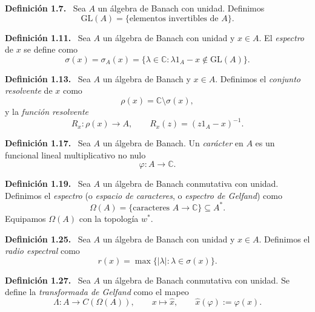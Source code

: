 \documentclass[11pt]{article}
\newcommand{\GL}{\mathrm{GL}}
\newenvironment{definicion}[1]
  {\par\medskip\noindent\textbf{Definición #1.}\ }
  {\par\medskip}
\begin{document}
\begin{definicion}{1.7}
Sea $A$ un álgebra de Banach con unidad. Definimos
\[
  \GL(A)=\{\text{elementos invertibles de }A\}.
\]
\end{definicion}

\begin{definicion}{1.11}
Sea $A$ un álgebra de Banach con unidad y $x\in A$. El \emph{espectro} de $x$ se define como
\[
  \sigma(x)=\sigma_A(x)
  =\{\lambda\in\mathbb{C}:\lambda 1_A-x\notin\GL(A)\}.
\]
\end{definicion}

\begin{definicion}{1.13}
Sea $A$ un álgebra de Banach y $x\in A$. Definimos el \emph{conjunto resolvente} de $x$ como
\[
  \rho(x)=\mathbb{C}\setminus\sigma(x),
\]
y la \emph{función resolvente}
\[
  R_x:\rho(x)\longrightarrow A,
  \qquad
  R_x(z)=(z1_A-x)^{-1}.
\]
\end{definicion}

\begin{definicion}{1.17}
Sea $A$ un álgebra de Banach. Un \emph{carácter} en $A$ es un funcional lineal multiplicativo no nulo
\[
  \varphi:A\longrightarrow\mathbb{C}.
\]
\end{definicion}

\begin{definicion}{1.19}
Sea $A$ un álgebra de Banach conmutativa con unidad. Definimos el \emph{espectro} (o \emph{espacio de caracteres}, o \emph{espectro de Gelfand}) como
\[
  \Omega(A)=\{\text{caracteres }A\to\mathbb{C}\}\subseteq A^*.
\]
Equipamos $\Omega(A)$ con la topología $w^*$.
\end{definicion}

\begin{definicion}{1.25}
Sea $A$ un álgebra de Banach con unidad y $x\in A$. Definimos el \emph{radio espectral} como
\[
  r(x)=\max\{\lvert\lambda\rvert:\lambda\in\sigma(x)\}.
\]
\end{definicion}

\begin{definicion}{1.27}
Sea $A$ un álgebra de Banach conmutativa con unidad. Se define la \emph{transformada de Gelfand} como el mapeo
\[
  \Lambda:A\longrightarrow C(\Omega(A)),
  \qquad
  x\longmapsto \widehat{x},
  \qquad
  \widehat{x}(\varphi):=\varphi(x).
\]
\end{definicion}
\end{document}
